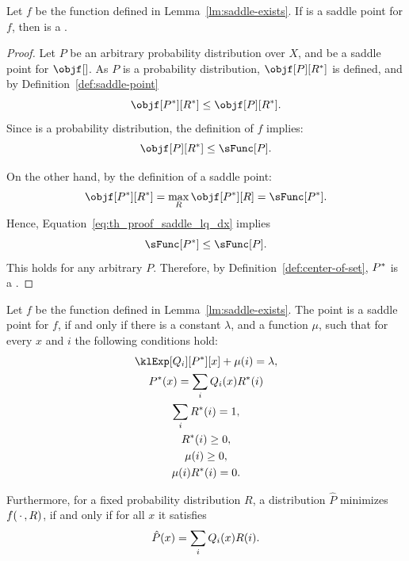 \begin{lemma} \label{lm:saddle-is-central}
    Let $f$ be the function defined in Lemma~\ref{lm:saddle-exists}.
    If \saddle is a saddle point for $f$, then \saddP is a \cd.
\end{lemma}

\begin{proof}
    \newcommand{\fsaddle}{\objf[\saddP][\saddR]}
    Let $P$ be an arbitrary probability distribution over $X$, and \saddle be a saddle point for $\objf[]$.
    As $P$ is a probability distribution, $\objf[P][\saddR]$ is defined, and by Definition~\ref{def:saddle-point}
    \begin{equation}
        \label{eq:th_proof_saddle_lq_dx}
        \fsaddle \leq \objf[P][\saddR].
    \end{equation}
    Since \saddR is a probability distribution, the definition of $f$ implies:
    \[
        \objf[P][\saddR] \leq \sFunc[P].
    \]

    On the other hand, by the definition of a saddle point:
    \[
        \fsaddle = \max_{R} \objf[\saddP][R] = \sFunc[\saddP].
    \]
    Hence, Equation~\ref{eq:th_proof_saddle_lq_dx} implies
    \[
        \sFunc[\saddP] \leq \sFunc[P].
    \]
    This holds for any arbitrary $P$.
    Therefore, by Definition~\ref{def:center-of-set}, $P^{*}$ is a \cd.
\end{proof}

\begin{lemma}
    \label{lm:saddle_conditions}
    Let $f$ be the function defined in Lemma~\ref{lm:saddle-exists}.
    The point \saddle is a saddle point for $f$, if and only if there is a constant $\lambda$, and a
    function $\mu$, such that for every $x$ and $i$ the following conditions hold:
    \begin{gather}
        \label{eq:kkt_lambda}
        \klExp[Q_i][\saddP][x] + \mu(i) = \lambda, \\
        \label{eq:kkt_w_avg}
        \combination[\saddR]{\saddP} \\
        \label{eq:kkt_r_sums_one}
        \sum_i \saddR(i) = 1, \\
        \label{eq:kkt_r_geq_0}
        \saddR(i) \geq 0, \\
        \label{eq:kkt_mu_geq_zero}
        \mu(i) \geq 0, \\
        \label{eq:kkt_rmu_is_zero}
        \mu(i) \saddR(i) = 0.
    \end{gather}

    Furthermore, for a fixed probability distribution $R$, a distribution $\hat{P}$ minimizes $f(\, \cdot \,,R)$, if and
    only if for all $x$ it satisfies
    \begin{equation}
        \label{eq:saddle_lm_minimizer_dist}
        \hat{P}(x) = \sum_i Q_i(x) R(i).
    \end{equation}
\end{lemma}

